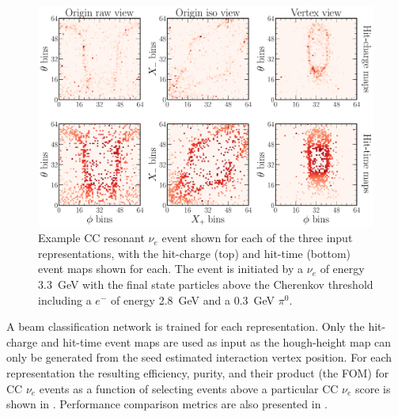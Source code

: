 \begin{figure} %
    \includegraphics[width=\textwidth]{diagrams/7-results/explore_repr_nuel_ccres_event.pdf}
    \caption[Example CC resonant $\nu_{e}$ event shown for different input representations]
    {Example CC resonant $\nu_{e}$ event shown for each of the three input representations, with
        the hit-charge (top) and hit-time (bottom) event maps shown for each. The event is
        initiated by a $\nu_{e}$ of energy \SI{3.3}{\GeV} with the final state particles above the
        Cherenkov threshold including a $e^{-}$ of energy \SI{2.8}{\GeV} and a \SI{0.3}{\GeV}
        $\pi^{0}$.}
    \label{fig:explore_repr_nuel_ccres_event}
\end{figure}


A beam classification network is trained for each representation. Only the hit-charge and hit-time
event maps are used as input as the hough-height map can only be generated from the seed estimated
interaction vertex position. For each representation the resulting efficiency, purity, and their
product (the FOM) for CC $\nu_{e}$ events as a function of selecting events above a particular CC
$\nu_{e}$ score is shown in . Performance comparison metrics
are also presented in .

